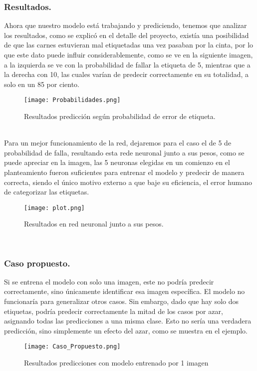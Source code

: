 \documentclass[12pt]{article}
\begin{document}
\subsubsection{Resultados.}
Ahora que nuestro modelo está trabajando y prediciendo, tenemos que analizar los resultados, como se explicó en el detalle del proyecto, existía una posibilidad de que las carnes estuvieran mal etiquetadas una vez pasaban por la cinta, por lo que este dato puede influir considerablemente, como se ve en la siguiente imagen, a la izquierda se ve con la probabilidad de fallar la etiqueta de 5, mientras que a la derecha con 10, las cuales varían de predecir correctamente en su totalidad, a solo en un 85 por ciento.
\begin{figure}[h]
    \centering
    \texttt{[image: Probabilidades.png]} 
    \caption{ Resultados predicción según probabilidad de error de etiqueta.}
    \label{fig:Vacuno_Porcino}
\end{figure}\\
Para un mejor funcionamiento de la red, dejaremos para el caso el de 5 de probabilidad de falla, resultando esta rede neuronal junto a sus pesos, como se puede apreciar en la imagen, las 5 neuronas elegidas en un comienzo en el planteamiento fueron suficientes para entrenar el modelo y predecir de manera correcta, siendo el único motivo externo a que baje su eficiencia, el error humano de categorizar las etiquetas.
\begin{figure}[h]
    \centering
    \texttt{[image: plot.png]} 
    \caption{ Resultados en red neuronal junto a sus pesos.}
    \label{fig:Vacuno_Porcino}
\end{figure}\\

\subsubsection{Caso propuesto.}

Si se entrena el modelo con solo una imagen, este no podría predecir correctamente, sino únicamente identificar esa imagen específica. El modelo no funcionaría para generalizar otros casos. Sin embargo, dado que hay solo dos etiquetas, podría predecir correctamente la mitad de los casos por azar, asignando todas las predicciones a una misma clase. Esto no sería una verdadera predicción, sino simplemente un efecto del azar, como se muestra en el ejemplo.

\begin{figure}[h]
    \centering
    \texttt{[image: Caso\_Propuesto.png]} 
    \caption{ Resultados predicciones con modelo entrenado por 1 imagen}
    \label{fig:Vacuno_Porcino}
\end{figure}
\end{document}
